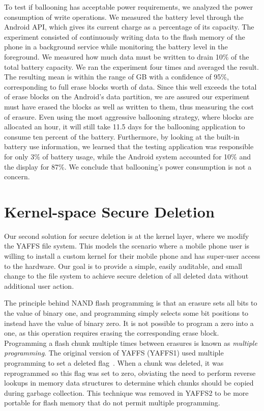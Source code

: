 \documentclass{acmtog}
\begin{document}
To test if ballooning has acceptable power requirements, we
analyzed the
power consumption of write operations. We measured the battery level 
through the Android API, which gives its current charge as a
percentage of its capacity.  The experiment consisted of continuously
writing data to the flash memory of the phone in a background service
while monitoring the battery level in the foreground. We measured
how much data must be written to drain 10\% of the total
battery capacity.  We ran the experiment four times and averaged the
result. The resulting mean is within the range of  GB
with a confidence of 95\%, corresponding
to  full erase blocks worth of data. Since this well exceeds
the total of  erase blocks on the Android's data partition, we
are assured our experiment must have erased the blocks as well as written to
them, thus measuring the cost of erasure.
Even using the most aggressive ballooning strategy, where 
blocks are allocated an hour, it will still take 11.5 days for the
ballooning application to consume ten percent of the
battery. Furthermore, by looking at the built-in battery use information, 
we learned that the testing
application was responsible for only 3\% of battery usage, while the
Android system accounted for 10\% and the display for 87\%. We
conclude that ballooning's power consumption is not a concern.


\section{Kernel-space Secure Deletion}
Our second solution for secure deletion is at the kernel layer, where we modify the
YAFFS file system. This models the
scenario where a mobile phone user is willing to install a custom kernel for
their mobile phone and has super-user access to the hardware.
Our goal is to provide a simple, easily auditable, and small change to the file system to achieve
secure deletion of all deleted data without additional user action.

The principle behind NAND flash programming is that an erasure sets all bits
to the value of binary one, and programming simply selects some bit positions to
instead have the value of binary zero. It is not possible to program a zero into
a one, as this operation requires erasing the corresponding erase block.
Programming a flash chunk multiple times between erasures is known as \emph{multiple
programming}.
The original version of YAFFS (YAFFS1) used multiple programming to set a
deleted flag~\cite{yaffs}. When a chunk was deleted, it was reprogrammed so this flag was
set to zero, obviating the need to perform reverse lookups in memory data
structures to determine which chunks should be copied during garbage collection. This technique was removed in
YAFFS2 to be more portable for flash memory that do not permit multiple programming.
\end{document}
